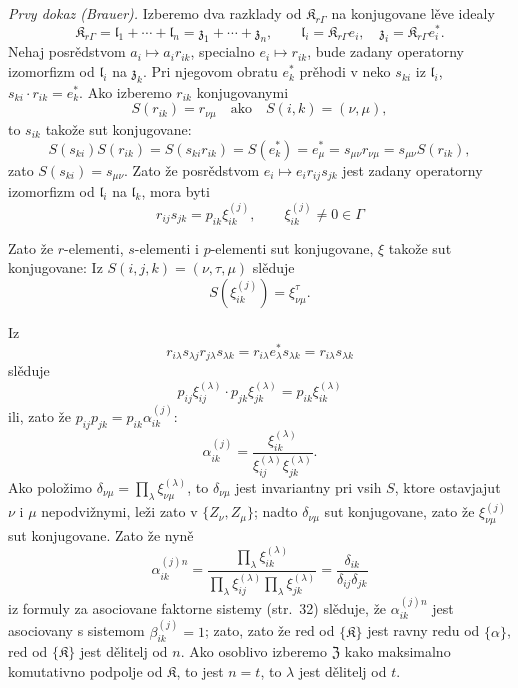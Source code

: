 \documentclass[11pt]{article}
\begin{document}
\emph{Prvy dokaz (Brauer).} Izberemo dva razklady od \(\mathfrak K_{r\Gamma}\) na konjugovane lěve idealy
\[
\mathfrak K_{r\Gamma}=\mathfrak l_1+\cdots+\mathfrak l_n=\mathfrak z_1+\cdots+\mathfrak z_n,\qquad
\mathfrak l_i=\mathfrak K_{r\Gamma}e_i,\quad
\mathfrak z_i=\mathfrak K_{r\Gamma}e_i^*.
\]
Nehaj posrědstvom \(a_i\mapsto a_ir_{ik}\), specialno \(e_i\mapsto r_{ik}\), bude zadany operatorny izomorfizm od \(\mathfrak l_i\) na \(\mathfrak z_k\). Pri njegovom obratu \(e_k^*\) prěhodi v neko \(s_{ki}\) iz \(\mathfrak l_i\), \(s_{ki}\cdot r_{ik}=e_k^*\). Ako izberemo \(r_{ik}\) konjugovanymi
\[
S(r_{ik})=r_{\nu\mu}\quad\text{ako}\quad S(i,k)=(\nu,\mu),
\]
to \(s_{ik}\) takože sut konjugovane:
\[
S(s_{ki})S(r_{ik})=S(s_{ki}r_{ik})=S(e_k^*)=e_\mu^*
=s_{\mu\nu}r_{\nu\mu}=s_{\mu\nu}S(r_{ik}),
\]
zato \(S(s_{ki})=s_{\mu\nu}\). Zato že posrědstvom \(e_i\mapsto e_ir_{ij}s_{jk}\) jest zadany operatorny izomorfizm od \(\mathfrak l_i\) na \(\mathfrak l_k\), mora byti
\[
r_{ij}s_{jk}=p_{ik}\xi_{ik}^{(j)},\qquad
\xi_{ik}^{(j)}\ne0\in\Gamma
\]

Zato že \(r\)-elementi, \(s\)-elementi i \(p\)-elementi sut konjugovane, \(\xi\) takože sut konjugovane: Iz \(S(i,j,k)=(\nu,\tau,\mu)\) slěduje
\[
S(\xi_{ik}^{(j)})=\xi_{\nu\mu}^{\tau}.
\]

Iz
\[
r_{i\lambda}s_{\lambda j}r_{j\lambda}s_{\lambda k}
=r_{i\lambda}e_\lambda^*s_{\lambda k}
=r_{i\lambda}s_{\lambda k}
\]
slěduje
\[
p_{ij}\xi_{ij}^{(\lambda)}\cdot p_{jk}\xi_{jk}^{(\lambda)}
=p_{ik}\xi_{ik}^{(\lambda)}
\]
ili, zato že \(p_{ij}p_{jk}=p_{ik}\alpha_{ik}^{(j)}\):
\[
\alpha_{ik}^{(j)}
=\frac{\xi_{ik}^{(\lambda)}}{\xi_{ij}^{(\lambda)}\xi_{jk}^{(\lambda)}}.
\]
Ako položimo \(\delta_{\nu\mu}=\prod_{\lambda}\xi_{\nu\mu}^{(\lambda)}\), to \(\delta_{\nu\mu}\) jest invariantny pri vsih \(S\), ktore ostavjajut \(\nu\) i \(\mu\) nepodvižnymi, leži zato v \(\{Z_\nu,Z_\mu\}\); nadto \(\delta_{\nu\mu}\) sut konjugovane, zato že \(\xi_{\nu\mu}^{(j)}\) sut konjugovane. Zato že nyně
\[
\alpha_{ik}^{(j)n}
=\frac{\prod_{\lambda}\xi_{ik}^{(\lambda)}}
       {\prod_{\lambda}\xi_{ij}^{(\lambda)}\prod_{\lambda}\xi_{jk}^{(\lambda)}}
=\frac{\delta_{ik}}{\delta_{ij}\delta_{jk}}
\]
iz formuly za asociovane faktorne sistemy (str.~32) slěduje, že \(\alpha_{ik}^{(j)n}\) jest asociovany s sistemom \(\beta_{ik}^{(j)}=1\); zato, zato že red od \(\{\mathfrak K\}\) jest ravny redu od \(\{\alpha\}\), red od \(\{\mathfrak K\}\) jest dělitelj od \(n\). Ako osoblivo izberemo \(\mathfrak Z\) kako maksimalno komutativno podpolje od \(\mathfrak K\), to jest \(n=t\), to \(\lambda\) jest dělitelj od \(t\).
\end{document}
